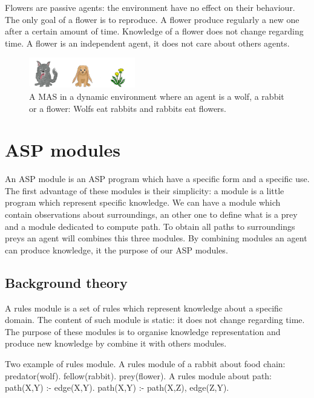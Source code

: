 \documentclass{aamas2012}
\begin{document}
	Flowers are passive agents: the environment have no effect on their behaviour.
	The only goal of a flower is to reproduce.
	A flower produce regularly a new one after a certain amount of time.
	Knowledge of a flower does not change regarding time.
	A flower is an independent agent, it does not care about others agents.

	\begin{figure}
		\centering
		\includegraphics[keepaspectratio=true,scale=3.0]{food_chain.pdf}
		\caption
		{
			\label{food_chain}
			A MAS in a dynamic environment where an agent is a wolf, a rabbit or a flower:
			Wolfs eat rabbits and rabbits eat flowers.
		}
	\end{figure}

\section{ASP modules}

	An ASP module is an ASP program which have a specific form and a specific use.
	The first advantage of these modules is their simplicity: a module is a little program which represent specific knowledge.
	We can have a module which contain observations about surroundings,
	an other one to define what is a prey and a module dedicated to compute path.
	To obtain all paths to surroundings preys an agent will combines this three modules.
	By combining modules an agent can produce knowledge, it the purpose of our ASP modules.

\subsection{Background theory}

	\begin{definition}
		A rules module is a set of rules which represent knowledge about a specific domain.
		The content of such module is static: it does not change regarding time.
		The purpose of these modules is to organise knowledge representation and produce
		new knowledge by combine it with others modules.
	\end{definition}
	
	\begin{example}
		Two example of rules module.\newline
		A rules module of a rabbit about food chain:\newline
		\newline
		predator(wolf).\newline
		fellow(rabbit).\newline
		prey(flower).\newline
		\newline
		A rules module about path:\newline
		\newline
		path(X,Y) :- edge(X,Y).\newline
		path(X,Y) :- path(X,Z), edge(Z,Y).
	\end{example}
\end{document}
